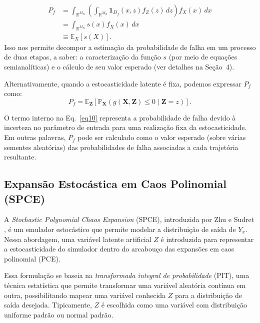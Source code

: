 \begin{equation}
\begin{aligned}
P_f &= \int_{\mathbb{R}^{M_X}} \left( \int_{\mathbb{R}^{M_Z}} \mathbf{1}_{D_f}(x,z) f_Z(z) \, dz \right) f_X(x) \, dx \\
    &= \int_{\mathbb{R}^{M_X}} s(x) f_X(x) \, dx \\
    &\equiv \mathbb{E}_X \left[ s(X) \right] .
\end{aligned}
\label{eq9}
\end{equation}
Isso nos permite decompor a estimação da probabilidade de falha em um processo de duas etapas, a saber: a caracterização da função \( s \) (por meio de equações semianalíticas) e o cálculo de seu valor esperado (ver detalhes na Seção~4).

Alternativamente, quando a estocasticidade latente é fixa, podemos expressar \( P_f \) como:
\begin{equation}
    P_f = \mathbb{E}_{\mathbf{Z}}\left[\mathbb{P}_{\mathbf{X}}\left(g(\mathbf{X},\mathbf{Z}) \leq 0 \mid \mathbf{Z} = z \right)\right].
    \label{eq10}
\end{equation}

O termo interno na Eq.~\eqref{eq10} representa a probabilidade de falha devido à incerteza no parâmetro de entrada para uma realização fixa da estocasticidade. Em outras palavras, \( P_f \) pode ser calculado como o valor esperado (sobre várias sementes aleatórias) das probabilidades de falha associadas a cada trajetória resultante.



\subsection{Expansão Estocástica em Caos Polinomial (SPCE)}
A \emph{Stochastic Polynomial Chaos Expansion} (SPCE), introduzida por Zhu e Sudret \cite{Zhu2023_SPCE}, 
é  um emulador estocástico que permite modelar a distribuição de saída de $Y_x$.  
Nessa abordagem, uma variável latente artificial $Z$ é introduzida para representar a 
estocasticidade do simulador dentro do arcabouço das expansões em caos polinomial (PCE).

Essa formulação se baseia na \emph{transformada integral de probabilidade} (PIT), 
uma técnica estatística que permite transformar uma variável aleatória contínua em outra, 
possibilitando mapear uma variável conhecida $Z$ para a distribuição de saída desejada. 
Tipicamente, $Z$ é escolhida como uma variável com distribuição uniforme padrão ou normal padrão.

